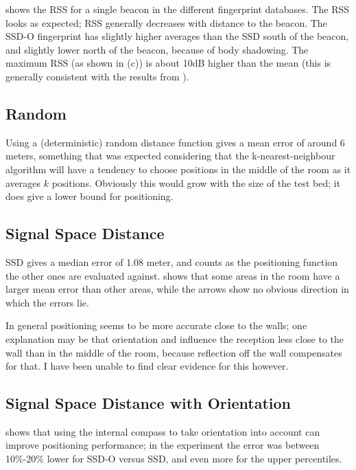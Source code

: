  shows the RSS for a single beacon in the different fingerprint databases.
The RSS looks as expected; RSS generally decreases with distance to the beacon.
The SSD-O fingerprint has slightly higher averages than the SSD south of the beacon, and slightly lower north of the beacon, because of body shadowing.
The maximum RSS (as shown in (c)) is about 10dB higher than the mean (this is generally consistent with the results from ).


\subsection{Random}
Using a (deterministic) random distance function gives a mean error of around 6 meters, something that was expected considering that the k-nearest-neighbour algorithm will have a tendency to choose positions in the middle of the room as it averages $k$ positions.
Obviously this would grow with the size of the test bed; it does give a lower bound for positioning.
\subsection{Signal Space Distance}
SSD gives a median error of 1.08 meter, and counts as the positioning function the other ones are evaluated against.
 shows that some areas in the room have a larger mean error than other areas, while the arrows show no obvious direction in which the errors lie.

In general positioning seems to be more accurate close to the walls; one explanation may be that orientation and \mpi influence the reception less close to the wall than in the middle of the room, because reflection off the wall compensates for that.
I have been unable to find clear evidence for this however.

\subsection{Signal Space Distance with Orientation}
\label{sec:architecture-measurements-ssd-o}
 shows that using the internal compass to take orientation into account can improve positioning performance; in the experiment the error was between 10\%-20\% lower for SSD-O versus SSD, and even more for the upper percentiles.

